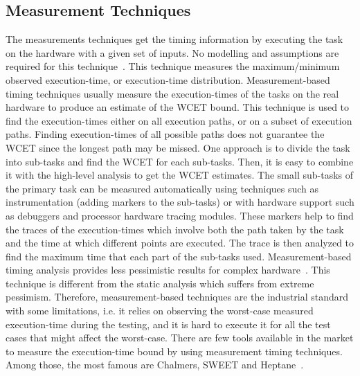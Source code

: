%
%

\subsection{Measurement Techniques}
\label{MBT}

The measurements techniques get the timing information by executing the task on the hardware with a given set of inputs. No modelling and assumptions are required for this technique~\cite{wilhelm2008worst}. This technique measures the maximum/minimum observed execution-time, or execution-time distribution. Measurement-based timing techniques usually measure the execution-times of the tasks on the real hardware to produce an estimate of the WCET bound. This technique is used to find the execution-times either on all execution paths, or on a subset of execution paths. Finding execution-times of all possible paths does not guarantee the WCET since the longest path may be missed. One approach is to divide the task into sub-tasks and find the WCET for each sub-tasks. Then, it is easy to combine it with the high-level analysis to get the WCET estimates. The small sub-tasks of the primary task can be measured automatically using techniques such as instrumentation (adding markers to the sub-tasks) or with hardware support such as debuggers and processor hardware tracing modules. These markers help to find the traces of the execution-times which involve both the path taken by the task and the time at which different points are executed. The trace is then analyzed to find the maximum time that each part of the sub-tasks used. Measurement-based timing analysis provides less pessimistic results for complex hardware~\cite{kosmidis2014measurement}. This technique is different from the static analysis which suffers from extreme pessimism. Therefore, measurement-based techniques are the industrial standard with some limitations, i.e. it relies on observing the worst-case measured execution-time during the testing, and it is hard to execute it for all the test cases that  might affect the worst-case. There are few tools available in the market to measure the execution-time bound by using measurement timing techniques. Among those, the most famous are Chalmers, SWEET and Heptane~\cite{wilhelm2008worst}.


